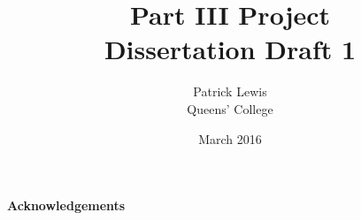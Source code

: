 \documentclass[11pt, oneside]{report}
\title{Part III Project \\Dissertation Draft 1}
\author{Patrick Lewis \\Queens' College}
\date{March 2016}							%
\makeatletter
\newcommand\ackname{Acknowledgements}
\newenvironment{acknowledgements}{%
     \titlepage
     \null\vfil
     \@beginparpenalty\@lowpenalty
     \begin{center}%
       \bfseries \ackname
       \@endparpenalty\@M
     \end{center}}%
    {\par\vfil\null\endtitlepage}
\newenvironment{acknowledgements}{%
     \if@twocolumn
       \section*{\abstractname}%
     \else
       \small
       \begin{center}%
         {\bfseries \ackname\vspace{-.5em}\vspace{\z@}}%
       \end{center}%
       \quotation
       
     \fi}
     {\if@twocolumn\else\endquotation\fi}
\newcommand\disname{ }
\newenvironment{disclaimer}{%
    \titlepage
     \null\vfil
     \@beginparpenalty\@lowpenalty
     \begin{center}%
       \bfseries \disname
       \@endparpenalty\@M
     \end{center}}%
    {\par\vfil\null\endtitlepage}
\makeatother
\begin{document}
\glsaddall
\maketitle
\begin{disclaimer}

\end{disclaimer}
\begin{acknowledgements}

\end{acknowledgements}
\begin{abstract}

\end{abstract}

\tableofcontents
\listoffigures
\printglossaries


%
%
%
%
%
%
%
%
\end{document}
